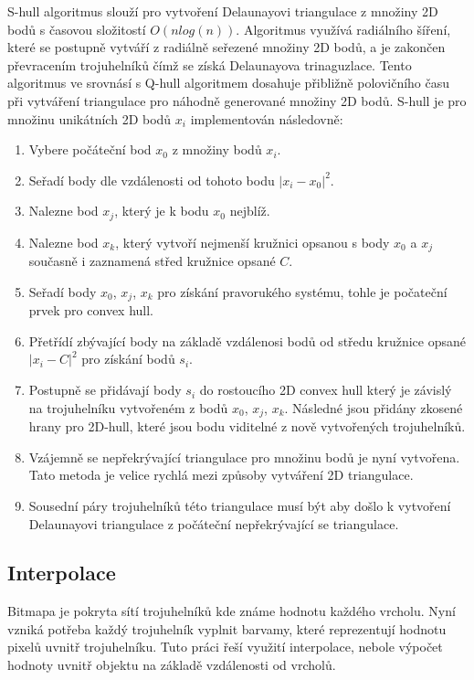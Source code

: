 \documentclass[czech,bachelor,dept460,male,csharp,cpdeclaration]{diploma}
\begin{document}
	S-hull algoritmus slouží pro vytvoření Delaunayovi triangulace z množiny 2D bodů s časovou složitostí $O(n  log(n))$. Algoritmus využívá radiálního šíření, které se postupně vytváří z radiálně seřezené množiny 2D bodů, a je zakončen převracením trojuhelníků čímž se získá Delaunayova trinaguzlace. Tento algoritmus ve srovnásí s Q-hull algoritmem dosahuje přibližně polovičního času při vytváření triangulace pro náhodně generované množiny 2D bodů. S-hull je pro množinu unikátních 2D bodů $x_i$ implementován následovně:
	\begin{enumerate}
		\item Vybere počáteční bod $x_0$ z množiny bodů $x_i$.
		\item Seřadí body dle vzdálenosti od tohoto bodu $|x_i - x_0|^2$.
		\item Nalezne bod $x_j$, který je k bodu $x_0$ nejblíž.
		\item Nalezne bod $x_k$, který vytvoří nejmenší kružnici opsanou s body $x_0$ a $x_j$ současně i zaznamená střed kružnice opsané $C$.
		\item Seřadí body $x_0$, $x_j$, $x_k$ pro získání pravorukého systému, tohle je počateční prvek pro convex hull.
		\item Přetřídí zbývající body na základě vzdálenosi bodů od středu kružnice opsané $|x_i - C|^2$ pro získání bodů $s_i$.
		\item Postupně se přidávají body $s_i$ do rostoucího 2D convex hull který je závislý na trojuhelníku vytvořeném z bodů $x_0$, $x_j$, $x_k$. Následné jsou přidány zkosené hrany pro 2D-hull, které jsou bodu viditelné z nově vytvořených trojuhelníků.
		\item Vzájemně se nepřekrývající triangulace pro množinu bodů je nyní vytvořena. Tato metoda je velice rychlá mezi způsoby vytváření 2D triangulace.
		\item Sousední páry trojuhelníků této triangulace musí být  aby došlo k vytvoření Delaunayovi triangulace z počáteční nepřekrývající se triangulace.
	\end{enumerate}
	
	\subsection{Interpolace}
	
	Bitmapa je pokryta sítí trojuhelníků kde známe hodnotu každého vrcholu. Nyní vzniká potřeba každý trojuhelník vyplnit barvamy, které reprezentují hodnotu pixelů uvnitř trojuhelníku. Tuto práci řeší využití interpolace, nebole výpočet hodnoty uvnitř objektu na základě vzdálenosti od vrcholů.
	
\end{document}
